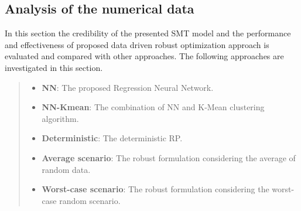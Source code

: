 \documentclass[letterpaper]{article} %
\begin{document}
\subsection{Analysis of the numerical data}
In this section the credibility of the presented SMT model and the performance and effectiveness of proposed data driven robust optimization approach is evaluated and compared with other approaches. The following approaches are investigated in this section.
\begin{quote}
\begin{itemize}
\item \textbf{NN}: The proposed Regression Neural Network.
\item \textbf{NN-Kmean}: The combination of NN and K-Mean clustering algorithm.
\item \textbf{Deterministic}: The deterministic RP.
\item \textbf{Average scenario}: The robust formulation considering the average of random data.
\item \textbf{Worst-case  scenario}: The robust formulation considering the worst-case random scenario.
\end{itemize}
\end{quote}
\end{document}
